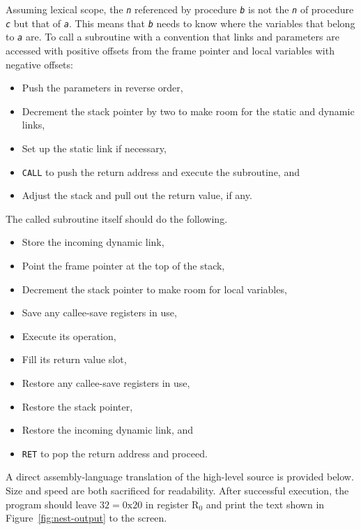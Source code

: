 \documentclass[12pt,english]{book}
\begin{document}
Assuming lexical scope,
the \texttt{\textit{n}} referenced by procedure \texttt{\textit{b}}
is not the \texttt{\textit{n}} of procedure \texttt{\textit{c}}
but that of \texttt{\textit{a}}.
This means that \texttt{\textit{b}} needs to know
where the variables that belong to \texttt{\textit{a}} are.
To call a subroutine with a convention that
links and parameters are accessed with positive offsets
from the frame pointer
and local variables with negative offsets:
\begin{itemize}
\item Push the parameters in reverse order,
\item Decrement the stack pointer by two to make room
  for the static and dynamic links,
\item Set up the static link if necessary,
\item \texttt{CALL} to push the return address
  and execute the subroutine, and
\item Adjust the stack and pull out the return value, if any.
\end{itemize}
The called subroutine itself should do the following.
\begin{itemize}
\item Store the incoming dynamic link,
\item Point the frame pointer at the top of the stack,
\item Decrement the stack pointer to make room for local variables,
\item Save any callee-save registers in use,
\item Execute its operation,
\item Fill its return value slot,
\item Restore any callee-save registers in use,
\item Restore the stack pointer,
\item Restore the incoming dynamic link, and
\item \texttt{RET} to pop the return address and proceed.
\end{itemize}

A direct assembly-language translation of the high-level source
is provided below.
Size and speed are both sacrificed for readability.
After successful execution,
the program should leave \(32=\text{0x20}\) in register \(\text{R}_0\)
and print the text shown in Figure~\ref{fig:nest-output}
to the screen.
\end{document}
